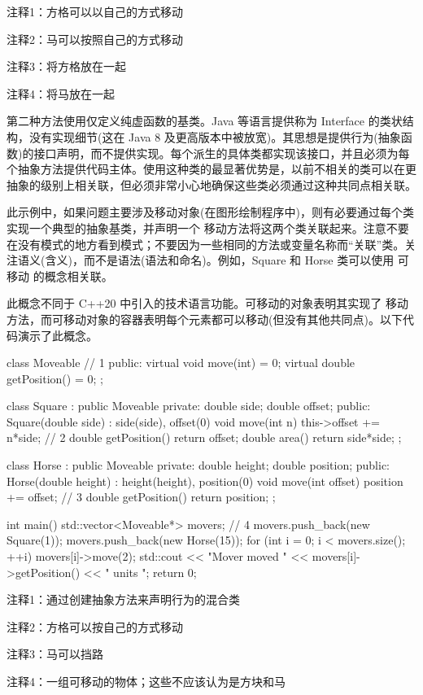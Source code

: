 {\footnotesize
注释1：方格可以以自己的方式移动

注释2：马可以按照自己的方式移动

注释3：将方格放在一起

注释4：将马放在一起
}

第二种方法使用仅定义纯虚函数的基类。Java 等语言提供称为 Interface 的类状结构，没有实现细节(这在 Java 8 及更高版本中被放宽)。其思想是提供行为(抽象函数)的接口声明，而不提供实现。每个派生的具体类都实现该接口，并且必须为每个抽象方法提供代码主体。使用这种类的最显著优势是，以前不相关的类可以在更抽象的级别上相关联，但必须非常小心地确保这些类必须通过这种共同点相关联。

此示例中，如果问题主要涉及移动对象(在图形绘制程序中)，则有必要通过每个类实现一个典型的抽象基类，并声明一个 移动方法将这两个类关联起来。注意不要在没有模式的地方看到模式；不要因为一些相同的方法或变量名称而“关联”类。关注语义(含义)，而不是语法(语法和命名)。例如，Square 和 Horse 类可以使用 可移动 的概念相关联。

此概念不同于 C++20 中引入的技术语言功能。可移动的对象表明其实现了 移动 方法，而可移动对象的容器表明每个元素都可以移动(但没有其他共同点)。以下代码演示了此概念。


\begin{cpp}
class Moveable { // 1
public:
  virtual void move(int) = 0;
  virtual double getPosition() = 0;
};

class Square : public Moveable {
private:
  double side;
  double offset;
public:
  Square(double side) : side(side), offset(0) {}
  void move(int n) { this->offset += n*side; } // 2
  double getPosition() { return offset; }
  double area() { return side*side; }
};

class Horse : public Moveable {
private:
  double height;
  double position;
public:
  Horse(double height) : height(height), position(0) {}
  void move(int offset) { position += offset; } // 3
  double getPosition() { return position; }
};

int main() {
  std::vector<Moveable*> movers; // 4
  movers.push_back(new Square(1));
  movers.push_back(new Horse(15));
  for (int i = 0; i < movers.size(); ++i) {
    movers[i]->move(2);
    std::cout << "Mover moved " << movers[i]->getPosition() << " units \n";
  }
  return 0;
}
\end{cpp}

{\footnotesize
注释1：通过创建抽象方法来声明行为的混合类

注释2：方格可以按自己的方式移动

注释3：马可以挡路

注释4：一组可移动的物体；这些不应该认为是方块和马
}

